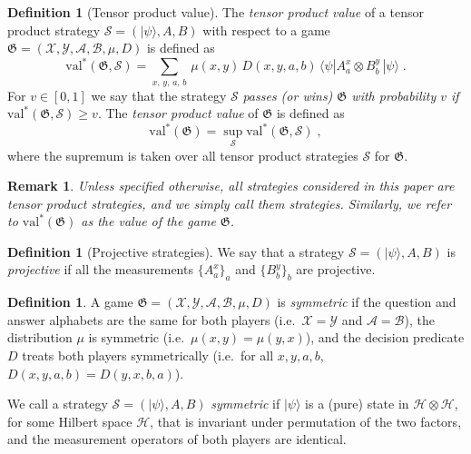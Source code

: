 \documentclass[11pt]{article}
\newtheorem{remark}[theorem]{Remark}
\theoremstyle{definition}
\newtheorem{definition}[theorem]{Definition}
\newcommand{\ket}[1]{|#1\rangle}
\newcommand{\bra}[1]{\langle#1|}
\newcommand{\mH}{\ensuremath{\mathcal{H}}}
\newcommand{\val}{\ensuremath{\mathrm{val}}}
\newcommand{\game}{\mathfrak{G}}
\newcommand{\strategy}{\mathscr{S}}
\renewcommand{\cal}[1]{\mathcal{#1}}
\begin{document}
\begin{definition}[Tensor product value]
  \label{def:tensor-product-value}
	The \emph{tensor product value} of a tensor product strategy $\strategy =
  (\ket{\psi}, A, B)$  with respect to a game $\game=(\cal{X}, \cal{Y}, \cal{A},
  \cal{B}, \mu, D)$ is defined as
  \begin{equation*}
		\val^*(\game, \strategy) = \sum_{x,\, y,\, a,\, b} \, \mu(x,y)\, D(x,y,a,b)\,
    \bra{\psi} A^x_a \otimes B^y_b\, \ket{\psi}\;.
  \end{equation*}
	For $v\in[0,1]$ we say that the strategy $\strategy$ \emph{passes (or wins)
    $\game$ with probability $v$ if} $\val^*(\game, \strategy) \geq v$.
  The \emph{tensor product value} of $\game$ is defined as
  \begin{equation*}
		\val^*(\game) = \sup_\strategy \val^*(\game, \strategy)\;,
  \end{equation*}
	where the supremum is taken over all tensor product strategies $\strategy$ for
  $\game$.
\end{definition}


\begin{remark}
  Unless specified otherwise, all strategies considered in this paper are tensor
  product strategies, and we simply call them \emph{strategies}.
  Similarly, we refer to $\val^*(\game)$ as the \emph{value} of the game
  $\game$.
\end{remark}


\begin{definition}[Projective strategies]
  \label{def:projective-strategy}
  We say that a strategy $\strategy = (\ket{\psi}, A, B)$ is \emph{projective} if
  all the measurements $\{A^x_a\}_a$ and $\{B^y_b\}_b$ are projective.
\end{definition}

\begin{definition}\label{rem:symmetric-games}
	A game $\game = (\cal{X}, \cal{Y}, \cal{A}, \cal{B}, \mu, D)$ is
  \emph{symmetric} if the question and answer alphabets are the same for both
  players (i.e.\
  $\cal{X} = \cal{Y}$ and $\cal{A} = \cal{B}$), the distribution $\mu$ is
  symmetric (i.e.\
  $\mu(x,y) = \mu(y,x)$), and the decision predicate $D$ treats both players
  symmetrically (i.e.\ for all $x,y,a,b$, $D(x,y,a,b) = D(y,x,b,a)$).
 
We call a strategy $\strategy = (\ket{\psi}, A, B)$
  \emph{symmetric} if $\ket{\psi}$ is a (pure) state in $\mH \otimes \mH$, for some
  Hilbert space $\mH$, that is invariant under permutation of the two factors,
  and the measurement operators of both players are identical.
\end{definition}
\end{document}
